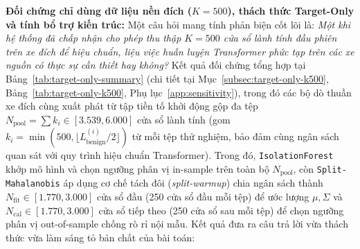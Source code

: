 \documentclass[12pt, a4paper, reqno, oneside]{book}
\DeclareRobustCommand{\code}[1]{\nolinkurl{#1}}
\begin{document}
\noindent\textbf{Đối chứng chỉ dùng dữ liệu nền đích ($K=500$), thách thức Target-Only và tính bổ trợ kiến trúc:} Một câu hỏi mang tính phản biện cốt lõi là: \textit{Một khi hệ thống đã chấp nhận cho phép thu thập $K=500$ cửa sổ lành tính đầu phiên trên xe đích để hiệu chuẩn, liệu việc huấn luyện Transformer phức tạp trên các xe nguồn có thực sự cần thiết hay không?} Kết quả đối chứng tổng hợp tại Bảng~\ref{tab:target-only-summary} (chi tiết tại Mục~\ref{subsec:target-only-k500}, Bảng~\ref{tab:target-only-k500}, Phụ lục~\ref{app:sensitivity}), trong đó các bộ dò thuần xe đích cùng xuất phát từ tập tiền tố khởi động gộp đa tệp $N_{\text{pool}} = \sum k_i \in [3.539, 6.000]$ cửa sổ lành tính (gom $k_i = \min(500, \lfloor L_{\text{benign}}^{(i)}/2\rfloor)$ từ mỗi tệp thử nghiệm, bảo đảm cùng ngân sách quan sát với quy trình hiệu chuẩn Transformer). Trong đó, \code{IsolationForest} khớp mô hình và chọn ngưỡng phân vị in-sample trên toàn bộ $N_{\text{pool}}$, còn \code{Split-Mahalanobis} áp dụng cơ chế tách đôi (\textit{split-warmup}) chia ngân sách thành $N_{\text{fit}} \in [1.770, 3.000]$ cửa sổ đầu (250 cửa sổ đầu mỗi tệp) để ước lượng $\mu, \Sigma$ và $N_{\text{cal}} \in [1.770, 3.000]$ cửa sổ tiếp theo (250 cửa sổ sau mỗi tệp) để chọn ngưỡng phân vị out-of-sample chống rò rỉ nội mẫu. Kết quả đưa ra câu trả lời vừa thách thức vừa làm sáng tỏ bản chất của bài toán:
\end{document}
